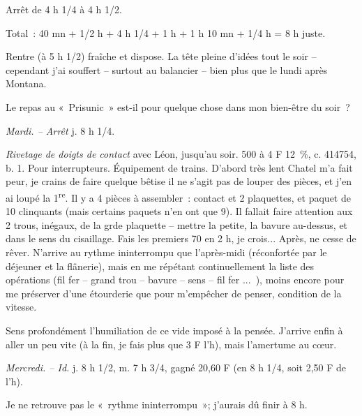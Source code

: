 \documentclass[french,twoside]{book} %
\begin{document}
Arrêt de 4 h 1/4 à 4 h 1/2.\par
Total : 40 mn + 1/2 h + 4 h 1/4 + 1 h + 1 h 10 mn + 1/4 h = 8 h juste.\par
Rentre (à 5 h 1/2) fraîche et dispose. La tête pleine d'idées tout le soir – cependant j'ai souffert – surtout au balancier – bien plus que le lundi après Montana.\par
Le repas au « Prisunic » est-il pour quelque chose dans mon bien-être du soir ?\par
{\itshape Mardi. – Arrêt} j. 8 h 1/4.\par
{\itshape Rivetage de doigts de contact} avec Léon, jusqu'au soir. 500 à 4 F 12 \%, c. 414754, b. 1. Pour interrupteurs. Équipement de trains. D'abord très lent Chatel m'a fait peur, je crains de faire quelque bêtise il ne s'agit pas de louper des pièces, et j'en ai loupé la 1\textsuperscript{re}. Il y a 4 pièces à assembler : contact et 2 plaquettes, et paquet de 10 clinquants (mais certains paquets n'en ont que 9). Il fallait faire attention aux 2 trous, inégaux, de la grde plaquette – mettre la petite, la bavure au-dessus, et dans le sens du cisaillage. Fais les premiers 70 en 2 h, je crois... Après, ne cesse de rêver. N'arrive au rythme ininterrompu que l'après-midi (réconfortée par le déjeuner et la flânerie), mais en me répétant continuellement la liste des opérations (fil fer – grand trou – bavure – sens – fil fer ... ), moins encore pour me préserver d'une étourderie que pour m'empêcher de penser, condition de la vitesse.\par
Sens profondément l'humiliation de ce vide imposé à la pensée. J'arrive enfin à aller un peu vite (à la fin, je fais plus que 3 F l'h), mais l'amertume au cœur.\par
{\itshape Mercredi. – Id.} j. 8 h 1/2, m. 7 h 3/4, gagné 20,60 F (en 8 h 1/4, soit 2,50 F de l'h).\par
Je ne retrouve pas le « rythme ininterrompu »; j'aurais dû finir à 8 h.\par
\end{document}
